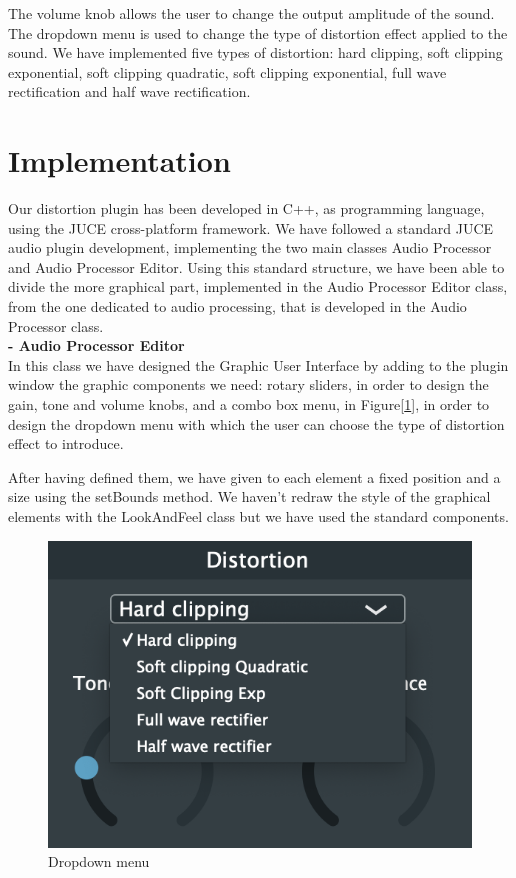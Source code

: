 \documentclass[letterpaper, 12pt]{article}
\begin{document}
	The volume knob allows the user to change the output amplitude of the sound.
	The dropdown menu is used to change the type of distortion effect applied to the sound. We have implemented five types of distortion: hard clipping, soft clipping exponential, soft clipping quadratic, soft clipping exponential, full wave rectification and half wave rectification.
	
	\section{Implementation}
	
	Our distortion plugin has been developed in C++, as programming language, using the JUCE cross-platform framework. We have followed a standard JUCE audio plugin development, implementing the two main classes Audio Processor and Audio Processor Editor. 
	Using this standard structure, we have been able to divide the more graphical part, implemented in the Audio Processor Editor class, from the one dedicated to audio processing, that is developed in the Audio Processor class.
	\\
	
	\textbf{-	Audio Processor Editor} 
\\
	
	In this class we have designed the Graphic User Interface by adding to the plugin window the graphic components we need: rotary sliders, in order to design the gain, tone and volume knobs, and a combo box menu, in Figure[\ref{fig:combobox}], in order to design the dropdown menu with which the user can choose the type of distortion effect to introduce.
	
	After having defined them, we have given to each element a fixed position and a size using the setBounds method.
	We haven’t redraw the style of the graphical elements with the LookAndFeel class but we have used the standard components.
	\\
	
	\begin{figure}[h!]
		\includegraphics[scale=0.6]{combobox.png}
		\centering
		\caption{Dropdown menu}
		\label{fig:combobox}
	\end{figure}
\end{document}
